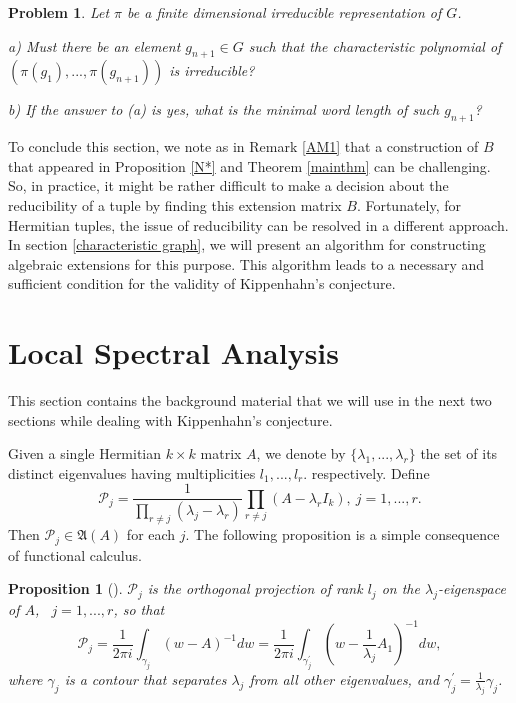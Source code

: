 \documentclass[draft, 12pt, reqno]{amsart}
\numberwithin{equation}{section}
\theoremstyle{plain}
\newtheorem{proposition}[theorem]{Proposition}
\newtheorem{problem}[theorem]{Problem}
\begin{document}
\begin{problem}
Let $\pi$ be a finite dimensional irreducible representation of $G$.

a) Must there be an element $g_{n+1}\in G$ such that the characteristic polynomial of $(\pi(g_1), ..., \pi(g_{n+1}))$ is irreducible?

b) If the answer to (a) is yes, what is the minimal word length of such $g_{n+1}$?
\end{problem}

To conclude this section, we note as in Remark \ref{AM1} that a construction of $B$ that appeared in Proposition \ref{N*} and Theorem \ref{mainthm} can be challenging. So, in practice, it might be rather difficult to make a decision about the reducibility of a tuple by finding this extension matrix $B$. Fortunately, for Hermitian tuples, the issue of reducibility can be resolved in a different approach. In section \ref{characteristic graph}, we will present an algorithm for constructing algebraic extensions for this purpose. This algorithm leads to a necessary and sufficient condition for the validity of Kippenhahn's conjecture. 


\section{Local Spectral Analysis}\label{local anal}

This section contains the background material that we will use in the next two sections while dealing with Kippenhahn's conjecture.

 Given a single Hermitian $k\times k$ matrix $A$, we denote by $\{\lambda_1,...,\lambda_r\}$ the set of its distinct eigenvalues having multiplicities $l_1,...,l_r$. respectively. Define
\begin{equation}\label{projections}
\mathcal{P}_j= \frac{1}{\displaystyle \prod_{r\neq j}(\lambda_j-\lambda_r)}\prod_{r\neq j}(A-\lambda_r I_k), \ j=1,...,r.	
\end{equation} Then $\mathcal{P}_j\in \mathfrak{A}(A)$ for each $j$. The following proposition is a simple consequence of functional calculus.

\begin{proposition}[\cite{SY}]\label{spectral projections}
$\mathcal{P}_j$	is the orthogonal projection of rank $l_j$ on the $\lambda_j$-eigenspace of $A$, \ $j=1,...,r$, so that
\begin{equation}\label{integral projection} 
{\mathcal P}_j=\frac{1}{2\pi i}\int_{\gamma_j} (w-A)^{-1}dw=\frac{1}{2\pi i} \int_{\gamma_j^\prime}\left(w-\frac{1}{\lambda_j}A_1\right)^{-1}dw,
\end{equation}
where $\gamma_j$ is a contour that separates $\lambda_j$ from all other eigenvalues, and $\gamma_j^\prime=\frac{1}{\lambda_j} \gamma_j$. 
\end{proposition}
\end{document}
